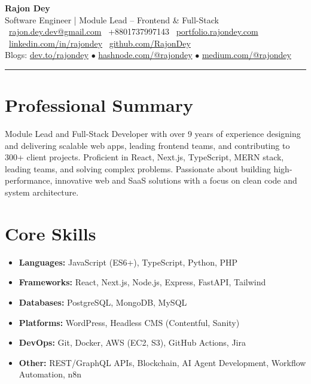\documentclass[a4paper,9pt]{article}
\begin{document}
\pagestyle{empty}

\begin{center}
    {\huge\bfseries Rajon Dey} \\
    \vspace{2mm}
    {\large Software Engineer | Module Lead – Frontend \& Full-Stack} \\
    \vspace{3mm}
    \faEnvelope\ \href{mailto:rajon.dey.dev@gmail.com}{rajon.dey.dev@gmail.com} \quad
    \faPhone\ +8801737997143 \quad
    \faGlobe\ \href{https://portfolio.rajondey.com}{portfolio.rajondey.com} \\
    \faLinkedinSquare\ \href{https://linkedin.com/in/rajondey}{linkedin.com/in/rajondey} \quad
    \faGithub\ \href{https://github.com/RajonDey}{github.com/RajonDey} \\
    Blogs: \href{https://dev.to/rajondey}{dev.to/rajondey} $\bullet$ \href{https://hashnode.com/@rajondey}{hashnode.com/@rajondey} $\bullet$ \href{https://medium.com/@rajondey}{medium.com/@rajondey}
\end{center}

\vspace{3mm}
\hrule
\vspace{3mm}

\section*{Professional Summary}
Module Lead and Full-Stack Developer with over 9 years of experience designing and delivering scalable web apps, leading frontend teams, and contributing to 300+ client projects. Proficient in React, Next.js, TypeScript, MERN stack, leading teams, and solving complex problems. Passionate about building high-performance, innovative web and SaaS solutions with a focus on clean code and system architecture.

\section*{Core Skills}
\begin{itemize}[leftmargin=*,itemsep=0.3pt]
    \item \textbf{Languages:} JavaScript (ES6+), TypeScript, Python, PHP
    \item \textbf{Frameworks:} React, Next.js, Node.js, Express, FastAPI, Tailwind
    \item \textbf{Databases:} PostgreSQL, MongoDB, MySQL
    \item \textbf{Platforms:} WordPress, Headless CMS (Contentful, Sanity)
    \item \textbf{DevOps:} Git, Docker, AWS (EC2, S3), GitHub Actions, Jira
    \item \textbf{Other:} REST/GraphQL APIs, Blockchain, AI Agent Development, Workflow Automation, n8n
\end{itemize}
\end{document}
